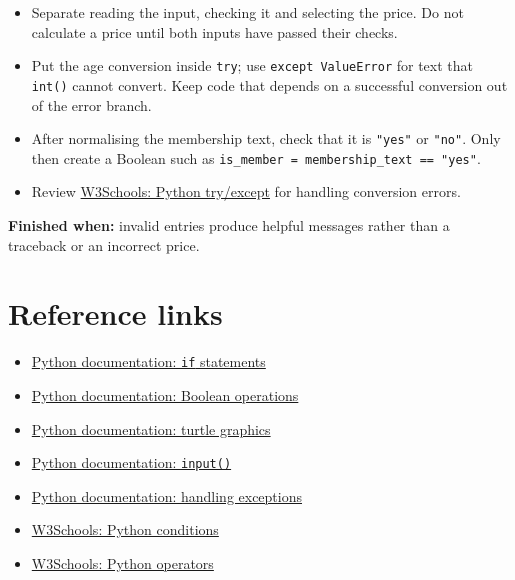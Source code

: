 \documentclass[12pt,a4paper]{article}
\begin{document}
\begin{itemize}
\item Separate reading the input, checking it and selecting the price. Do not calculate a price until both inputs have passed their checks.
\item Put the age conversion inside \texttt{try}; use \texttt{except ValueError} for text that \texttt{int()} cannot convert. Keep code that depends on a successful conversion out of the error branch.
\item After normalising the membership text, check that it is \texttt{"yes"} or \texttt{"no"}. Only then create a Boolean such as \texttt{is\_member = membership\_text == "yes"}.
\item Review \href{https://www.w3schools.com/python/python_try_except.asp}{W3Schools: Python try/except} for handling conversion errors.
\end{itemize}
\textbf{Finished when:} invalid entries produce helpful messages rather than a traceback or an incorrect price.

\section*{Reference links}
\begin{itemize}
\item \href{https://docs.python.org/3/tutorial/controlflow.html\#if-statements}{Python documentation: \texttt{if} statements}
\item \href{https://docs.python.org/3/library/stdtypes.html\#boolean-operations-and-or-not}{Python documentation: Boolean operations}
\item \href{https://docs.python.org/3/library/turtle.html}{Python documentation: turtle graphics}
\item \href{https://docs.python.org/3/library/functions.html\#input}{Python documentation: \texttt{input()}}
\item \href{https://docs.python.org/3/tutorial/errors.html\#handling-exceptions}{Python documentation: handling exceptions}
\item \href{https://www.w3schools.com/python/python_conditions.asp}{W3Schools: Python conditions}
\item \href{https://www.w3schools.com/python/python_operators.asp}{W3Schools: Python operators}
\end{itemize}
\end{document}
